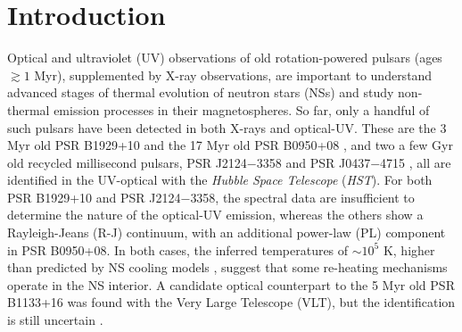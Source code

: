 \documentclass[pdftex,twocolumn]{aastex62}
\newcommand{\gp}[1]{{\color{blue} #1}}
\begin{document}
\section{Introduction}
\label{intro}

Optical and ultraviolet (UV) observations of 
old  
rotation-powered 
pulsars (ages $\gtrsim 1$ Myr), 
supplemented by X-ray observations,
are  important to understand advanced stages of  thermal evolution  
of neutron stars (NSs) and study  non-thermal  
emission processes in their magnetospheres. 
So far, only a handful of such pulsars
have been detected in both X-rays and  optical-UV. 
These are 
the 3 Myr old PSR B1929+10 \citep{1996pavlov,2002mlcw} and 
the 17 Myr old PSR B0950+08 \citep{1996pavlov,Pavlov2017}, 
and two a few Gyr old  recycled  millisecond pulsars, PSR J2124$-$3358  \citep{2017rangelov} 
and PSR J0437$-$4715   \citep{2004karg,2012durant},    
all are identified in the UV-optical with the {\sl Hubble Space Telescope} ({\sl HST}). 
For both PSR B1929+10 and PSR J2124$-$3358, the spectral data are insufficient to determine the nature of the optical-UV emission, whereas the others 
show a Rayleigh-Jeans (R-J) continuum, with an additional power-law (PL) component in PSR B0950+08. 
In both cases, the inferred temperatures of $\sim 10^5$ K, higher than predicted by NS cooling models 
\citep[e.g.,][]{2004yp}, 
suggest that some re-heating mechanisms operate in the NS interior. A candidate optical counterpart to the 5 Myr old PSR B1133+16 was found with the Very Large Telescope (VLT), but the identiﬁcation is still uncertain 
\citep{2008zhar,2013zm}.
\end{document}
